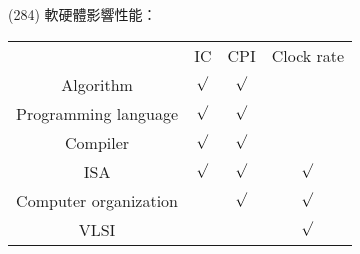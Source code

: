 \item \begin{theorem}{(284)} 軟硬體影響性能：
    \begin{table}[H]
        \centering
        \begin{tabular}{|c|c|c|c|}
            \hline
             & IC & CPI & Clock rate \\
            \Xhline{2\arrayrulewidth}
            Algorithm & $\surd$ & $\surd$ & \\
            \hline
            Programming language & $\surd$ & $\surd$ & \\
            \hline
            Compiler & $\surd$ & $\surd$ & \\
            \hline
            ISA & $\surd$ & $\surd$ & $\surd$ \\
            \hline
            Computer organization & & $\surd$ & $\surd$ \\
            \hline
            VLSI & & & $\surd$ \\
            \hline
        \end{tabular}
    \end{table}
\end{theorem}
